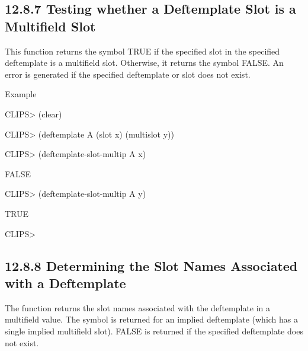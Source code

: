 \documentclass[letterpaper,10pt,english]{sphinxmanual}
\begin{document}
\subsection{12.8.7 Testing whether a Deftemplate Slot is a Multifield Slot}
\label{\detokenize{actions:testing-whether-a-deftemplate-slot-is-a-multifield-slot}}
This function returns the symbol TRUE if the specified slot in the
specified deftemplate is a multifield slot. Otherwise, it returns the
symbol FALSE. An error is generated if the specified deftemplate or slot
does not exist.


\begin{sphinxVerbatim}[commandchars=\\\{\}]
  
\end{sphinxVerbatim}

Example

CLIPS\textgreater{} (clear)

CLIPS\textgreater{} (deftemplate A (slot x) (multislot y))

CLIPS\textgreater{} (deftemplate-slot-multip A x)

FALSE

CLIPS\textgreater{} (deftemplate-slot-multip A y)

TRUE

CLIPS\textgreater{}


\subsection{12.8.8 Determining the Slot Names Associated with a Deftemplate}
\label{\detokenize{actions:determining-the-slot-names-associated-with-a-deftemplate}}
The  function returns the slot names
associated with the deftemplate in a multifield value. The symbol
 is returned for an implied deftemplate (which has a single
implied multifield slot). FALSE is returned if the specified deftemplate
does not exist.


\begin{sphinxVerbatim}[commandchars=\\\{\}]
 
\end{sphinxVerbatim}
\end{document}
